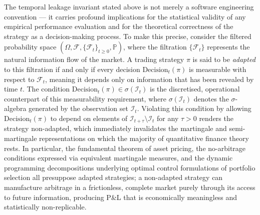 \documentclass[12pt,openany]{book}
\numberwithin{equation}{chapter}
\theoremstyle{plain}
\theoremstyle{definition}
\theoremstyle{remark}
\begin{document}
The temporal leakage invariant stated above is not merely a software engineering convention — it carries profound implications for the statistical validity of any empirical performance evaluation and for the theoretical correctness of the strategy as a decision-making process. To make this precise, consider the filtered probability space $(\Omega, \mathcal{F}, \{\mathcal{F}_t\}_{t \geq 0}, \mathbb{P})$, where the filtration $\{\mathcal{F}_t\}$ represents the natural information flow of the market. A trading strategy $\pi$ is said to be \emph{adapted} to this filtration if and only if every decision $\text{Decision}_t(\pi)$ is measurable with respect to $\mathcal{F}_t$, meaning it depends only on information that has been revealed by time $t$. The condition $\text{Decision}_t(\pi) \in \sigma(\mathcal{I}_t)$ is the discretised, operational counterpart of this measurability requirement, where $\sigma(\mathcal{I}_t)$ denotes the $\sigma$-algebra generated by the observation set $\mathcal{I}_t$. Violating this condition by allowing $\text{Decision}_t(\pi)$ to depend on elements of $\mathcal{I}_{t+\tau} \setminus \mathcal{I}_t$ for any $\tau > 0$ renders the strategy non-adapted, which immediately invalidates the martingale and semi-martingale representations on which the majority of quantitative finance theory rests. In particular, the fundamental theorem of asset pricing, the no-arbitrage conditions expressed via equivalent martingale measures, and the dynamic programming decompositions underlying optimal control formulations of portfolio selection all presuppose adapted strategies; a non-adapted strategy can manufacture arbitrage in a frictionless, complete market purely through its access to future information, producing P\&L that is economically meaningless and statistically non-replicable.
\end{document}

